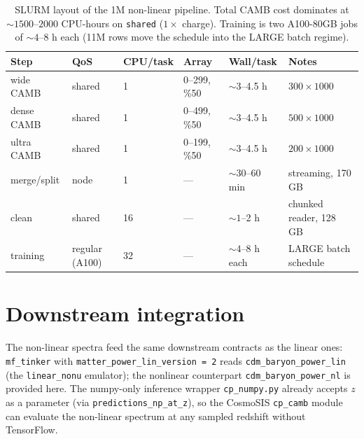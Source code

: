 \documentclass[11pt]{article}
\begin{document}
\begin{table}[h]
  \centering
  \begin{tabular}{l l l l l l}
    \toprule
    Step & QoS & CPU/task & Array & Wall/task & Notes \\
    \midrule
    wide CAMB   & shared & 1 & 0--299, \%50 & $\sim 3$--4.5 h & $300 \times 1000$ \\
    dense CAMB  & shared & 1 & 0--499, \%50 & $\sim 3$--4.5 h & $500 \times 1000$ \\
    ultra CAMB  & shared & 1 & 0--199, \%50 & $\sim 3$--4.5 h & $200 \times 1000$ \\
    merge/split & node   & 1 & ---          & $\sim 30$--60 min & streaming, 170 GB \\
    clean       & shared & 16 & ---         & $\sim 1$--2 h       & chunked reader, 128 GB \\
    training    & regular (A100) & 32 & --- & $\sim 4$--8 h each & LARGE batch schedule \\
    \bottomrule
  \end{tabular}
  \caption{SLURM layout of the 1M non-linear pipeline. Total CAMB cost
  dominates at $\sim 1500$--$2000$ CPU-hours on \texttt{shared} ($1\times$
  charge). Training is two A100-80GB jobs of $\sim 4$--$8$ h each
  (11M rows move the schedule into the LARGE batch regime).}
  \label{tab:compute}
\end{table}

\section{Downstream integration}
\label{sec:next}

The non-linear spectra feed the same downstream contracts as the linear
ones: \texttt{mf\_tinker} with \texttt{matter\_power\_lin\_version = 2}
reads \texttt{cdm\_baryon\_power\_lin} (the \texttt{linear\_nonu}
emulator); the nonlinear counterpart \texttt{cdm\_baryon\_power\_nl} is
provided here. The numpy-only inference wrapper \texttt{cp\_numpy.py}
already accepts $z$ as a parameter (via \texttt{predictions\_np\_at\_z}),
so the CosmoSIS \texttt{cp\_camb} module can evaluate the non-linear
spectrum at any sampled redshift without TensorFlow.
\end{document}

